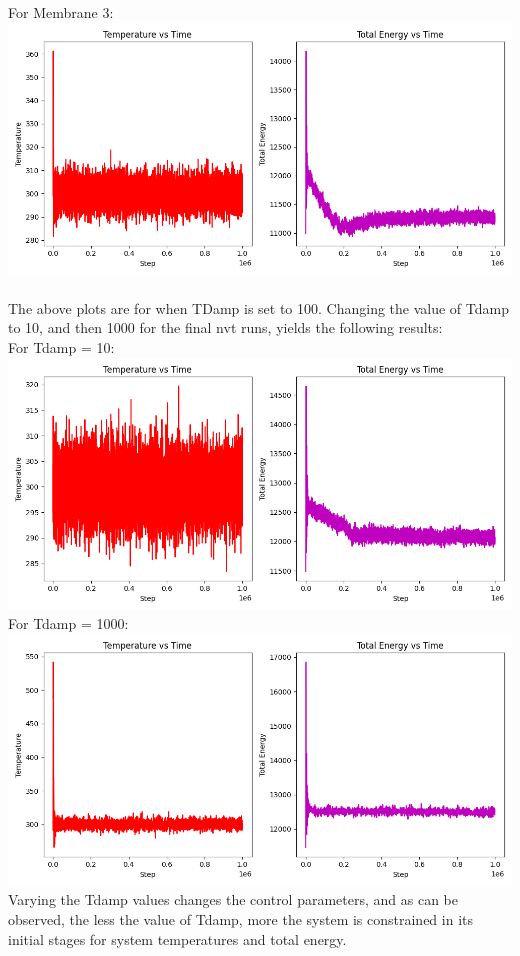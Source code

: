 \documentclass[11pt]{article}
\begin{document}
For Membrane 3: \\
\includegraphics[scale=0.5]{Mem3_2.png} \\ \\
The above plots are for when TDamp is set to 100. Changing the value of Tdamp to 10, and then 1000 for the final nvt runs, yields the following results:\\
For Tdamp = 10: \\
\includegraphics[scale=0.5]{T10.png}\\
For Tdamp = 1000: \\
\includegraphics[scale=0.5]{T1000.png}\\
Varying the Tdamp values changes the control parameters, and as can be observed, the less the value of Tdamp, more the system is constrained in its initial stages for system temperatures and total energy.
\end{document}
